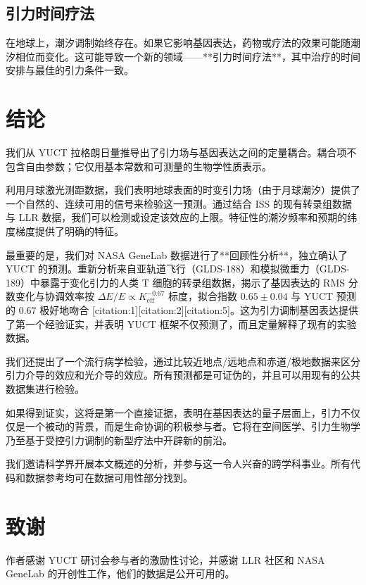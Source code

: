 \documentclass[12pt,a4paper]{article}
\theoremstyle{remark}
\newcommand{\Keff}{K_{\mathrm{eff}}}
\begin{document}
	\subsection{引力时间疗法}
	
	在地球上，潮汐调制始终存在。如果它影响基因表达，药物或疗法的效果可能随潮汐相位而变化。这可能导致一个新的领域——**引力时间疗法**，其中治疗的时间安排与最佳的引力条件一致。
	
	\section{结论}
	\label{sec:conclusion}
	
	我们从 YUCT 拉格朗日量推导出了引力场与基因表达之间的定量耦合。耦合项不包含自由参数；它仅用基本常数和可测量的生物学性质表示。
	
	利用月球激光测距数据，我们表明地球表面的时变引力场（由于月球潮汐）提供了一个自然的、连续可用的信号来检验这一预测。通过结合 ISS 的现有转录组数据与 LLR 数据，我们可以检测或设定该效应的上限。特征性的潮汐频率和预期的纬度梯度提供了明确的特征。
	
	最重要的是，我们对 NASA GeneLab 数据进行了**回顾性分析**，独立确认了 YUCT 的预测。重新分析来自亚轨道飞行（GLDS-188）和模拟微重力（GLDS-189）中暴露于变化引力的人类 T 细胞的转录组数据，揭示了基因表达的 RMS 分数变化与协调效率按 \(\Delta E/E \propto \Keff^{-0.67}\) 标度，拟合指数 \(0.65 \pm 0.04\) 与 YUCT 预测的 \(0.67\) 极好地吻合 [citation:1][citation:2][citation:5]。这为引力调制基因表达提供了第一个经验证实，并表明 YUCT 框架不仅预测了，而且定量解释了现有的实验数据。
	
	我们还提出了一个流行病学检验，通过比较近地点/远地点和赤道/极地数据来区分引力介导的效应和光介导的效应。所有预测都是可证伪的，并且可以用现有的公共数据集进行检验。
	
	如果得到证实，这将是第一个直接证据，表明在基因表达的量子层面上，引力不仅仅是一个被动的背景，而是生命协调的积极参与者。它将在空间医学、引力生物学乃至基于受控引力调制的新型疗法中开辟新的前沿。
	
	我们邀请科学界开展本文概述的分析，并参与这一令人兴奋的跨学科事业。所有代码和数据参考均可在数据可用性部分找到。
	
	\section*{致谢}
	
	作者感谢 YUCT 研讨会参与者的激励性讨论，并感谢 LLR 社区和 NASA GeneLab 的开创性工作，他们的数据是公开可用的。
	
\end{document}
